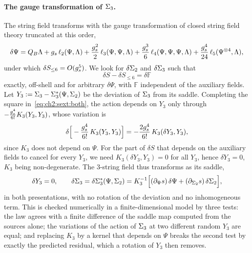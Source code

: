 \paragraph{The gauge transformation of $\Sigma_3$.}
The string field transforms with the gauge transformation of closed string field theory truncated at this order,
\begin{equation}
  \delta \Psi
    = Q_B \Lambda
      + g_s \, \ell_2(\Psi, \Lambda)
      + \frac{g_s^2}{2} \, \ell_3(\Psi, \Psi, \Lambda)
      + \frac{g_s^3}{6} \, \ell_4(\Psi, \Psi, \Psi, \Lambda)
      + \frac{g_s^4}{24} \, \ell_5(\Psi^{\otimes 4}, \Lambda),
\end{equation}
under which $\delta S_{\le 6} = O(g_s^5)$.
We look for $\delta \Sigma_2$ and $\delta \Sigma_3$ such that
\begin{equation}
  \label{eq:ch2:sext:goal}
  \delta S - \delta S_{\le 6}
    = \delta \mathbb F
\end{equation}
exactly, off-shell and for arbitrary $\delta \Psi$, with $\mathbb F$ independent of the auxiliary fields.
Let $Y_3 := \Sigma_3 - \Sigma_3^*(\Psi, \Sigma_2)$ be the deviation of $\Sigma_3$ from its saddle.
Completing the square in~\eqref{eq:ch2:sext:both}, the action depends on $Y_3$ only through $- \tfrac{g_s^4}{6!} K_3(Y_3, Y_3)$, whose variation is
\begin{equation}
  \delta \Big[ - \frac{g_s^4}{6!} \, K_3(Y_3, Y_3) \Big]
    = - \frac{2 g_s^4}{6!} \, K_3(\delta Y_3, Y_3),
\end{equation}
since $K_3$ does not depend on $\Psi$.
For the part of $\delta S$ that depends on the auxiliary fields to cancel for every $Y_3$, we need $K_3(\delta Y_3, Y_3) = 0$ for all $Y_3$, hence $\delta Y_3 = 0$, $K_3$ being non-degenerate.
The $3$-string field thus transforms as its saddle,
\begin{equation}
  \label{eq:ch2:sext:gauge3}
  \delta Y_3
    = 0,
  \qquad
  \delta \Sigma_3
    = \delta \Sigma_3^*(\Psi, \Sigma_2)
    = K_3^{-1} \Big[ (\partial_\Psi s) \, \delta \Psi + (\partial_{\Sigma_2} s) \, \delta \Sigma_2 \Big],
\end{equation}
in both presentations, with no rotation of the deviation and no inhomogeneous term.
This is checked numerically in a finite-dimensional model by three tests: the law agrees with a finite difference of the saddle map computed from the sources alone; the variations of the action of $\Sigma_3$ at two different random $Y_3$ are equal; and replacing $K_3$ by a kernel that depends on $\Psi$ breaks the second test by exactly the predicted residual, which a rotation of $Y_3$ then removes.

